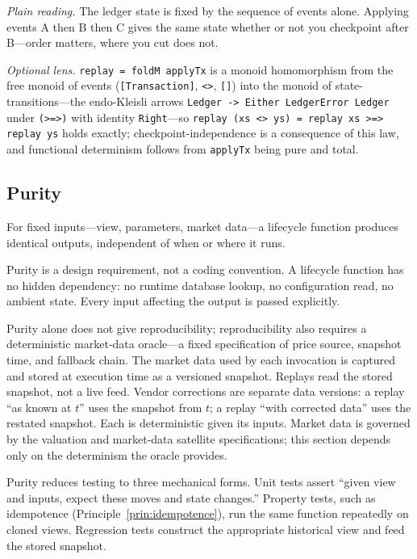 \begin{remark}
\emph{Plain reading.} The ledger state is fixed by the sequence of events alone. Applying events A then B then C gives the same state whether or not you checkpoint after B---order matters, where you cut does not.

\emph{Optional lens.} \texttt{replay = foldM applyTx} is a monoid homomorphism from the free monoid of events (\texttt{[Transaction]}, \texttt{<>}, \texttt{[]}) into the monoid of state-transitions---the endo-Kleisli arrows \texttt{Ledger -> Either LedgerError Ledger} under \texttt{(>=>)} with identity \texttt{Right}---so \texttt{replay (xs <> ys) = replay xs >=> replay ys} holds exactly; checkpoint-independence is a consequence of this law, and functional determinism follows from \texttt{applyTx} being pure and total.
\end{remark}

\subsection{Purity}

\begin{principle}[Purity]
\label{prin:purity}
For fixed inputs---view, parameters, market data---a lifecycle function produces identical outputs, independent of when or where it runs.
\end{principle}

Purity is a design requirement, not a coding convention. A lifecycle function has no hidden dependency: no runtime database lookup, no configuration read, no ambient state. Every input affecting the output is passed explicitly.

Purity alone does not give reproducibility; reproducibility also requires a deterministic market-data oracle---a fixed specification of price source, snapshot time, and fallback chain. The market data used by each invocation is captured and stored at execution time as a versioned snapshot. Replays read the stored snapshot, not a live feed. Vendor corrections are separate data versions: a replay ``as known at $t$'' uses the snapshot from $t$; a replay ``with corrected data'' uses the restated snapshot. Each is deterministic given its inputs. Market data is governed by the valuation and market-data satellite specifications; this section depends only on the determinism the oracle provides.

Purity reduces testing to three mechanical forms. Unit tests assert ``given view and inputs, expect these moves and state changes.'' Property tests, such as idempotence (Principle~\ref{prin:idempotence}), run the same function repeatedly on cloned views. Regression tests construct the appropriate historical view and feed the stored snapshot.

